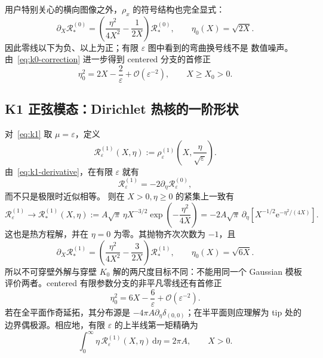 \documentclass[11pt,a4paper,fontset=fandol]{ctexart}
\newcommand{\dd}{\,\mathrm d}
\newcommand{\e}{\mathrm e}
\newcommand{\Order}{\mathcal O}
\begin{document}
用户特别关心的横向图像之外，$\rho_x$ 的符号结构也完全显式：
\begin{equation}
  \partial_X\mathcal R^{(0)}_*
  =\left(\frac{\eta^2}{4X^2}-\frac1{2X}\right)
  \mathcal R^{(0)}_*,
  \qquad
  \eta_{0}(X)=\sqrt{2X}.
  \label{eq:k0-rhox}
\end{equation}
因此零线以下为负、以上为正；有限 $\varepsilon$ 图中看到的弯曲换号线不是
数值噪声。由~\eqref{eq:k0-correction} 进一步得到 centered 分支的首修正
\begin{equation}
  \eta_0^2=2X-\frac{2}{\varepsilon}+\Order(\varepsilon^{-2}),
  \qquad X\ge X_0>0.
  \label{eq:k0-zero-correction}
\end{equation}

\subsection{K1 正弦模态：Dirichlet 热核的一阶形状}

对~\eqref{eq:k1} 取 $\mu=\varepsilon$，定义
\begin{equation}
  \mathcal R^{(1)}_\varepsilon(X,\eta)
  :=\rho^{(1)}_\varepsilon\!\left(X,\frac{\eta}{\sqrt\varepsilon}\right).
\end{equation}
由~\eqref{eq:k1-derivative}，在有限 $\varepsilon$ 就有
\begin{equation}
  \mathcal R^{(1)}_\varepsilon
  =-2\partial_\eta\mathcal R^{(0)}_\varepsilon,
  \label{eq:k1-finite-derivative}
\end{equation}
而不只是极限时近似相等。
则在 $X>0,\eta\ge0$ 的紧集上一致有
\begin{equation}
  \mathcal R^{(1)}_\varepsilon
  \longrightarrow
  \mathcal R^{(1)}_*(X,\eta)
  :=A\sqrt\pi\,\eta X^{-3/2}
  \exp\!\left(-\frac{\eta^2}{4X}\right)
  =-2A\sqrt\pi\,\partial_\eta
  \left[X^{-1/2}\e^{-\eta^2/(4X)}\right].
  \label{eq:k1-limit}
\end{equation}
这也是热方程解，并在 $\eta=0$ 为零。其抛物齐次次数为 $-1$，且
\begin{equation}
  \partial_X\mathcal R^{(1)}_*
  =\left(\frac{\eta^2}{4X^2}-\frac{3}{2X}\right)
   \mathcal R^{(1)}_*,
  \qquad
  \eta_0(X)=\sqrt{6X}.
  \label{eq:k1-rhox}
\end{equation}
所以不可穿壁外解与穿壁 $K_0$ 解的两尺度目标不同：不能用同一个 Gaussian
模板评价两者。centered 有限参数分支的非平凡零线还有首修正
\begin{equation}
  \eta_0^2=6X-\frac{6}{\varepsilon}+\Order(\varepsilon^{-2}).
  \label{eq:k1-zero-correction}
\end{equation}
若在全平面作奇延拓，其分布源是
$-4\pi A\partial_\eta\delta_{(0,0)}$；在半平面则应理解为 tip 处的
边界偶极源。相应地，有限 $\varepsilon$ 的上半线第一矩精确为
\begin{equation}
  \int_0^\infty \eta\,\mathcal R^{(1)}_\varepsilon(X,\eta)\dd\eta
  =2\pi A,\qquad X>0.
  \label{eq:k1-first-moment}
\end{equation}
\end{document}
